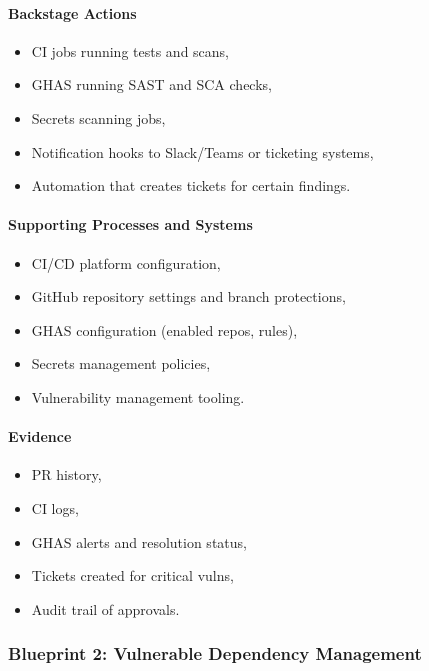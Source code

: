 \documentclass[11pt]{article}
\begin{document}
\paragraph{Backstage Actions}

\begin{itemize}
  \item CI jobs running tests and scans,
  \item GHAS running SAST and SCA checks,
  \item Secrets scanning jobs,
  \item Notification hooks to Slack/Teams or ticketing systems,
  \item Automation that creates tickets for certain findings.
\end{itemize}

\paragraph{Supporting Processes and Systems}

\begin{itemize}
  \item CI/CD platform configuration,
  \item GitHub repository settings and branch protections,
  \item GHAS configuration (enabled repos, rules),
  \item Secrets management policies,
  \item Vulnerability management tooling.
\end{itemize}

\paragraph{Evidence}

\begin{itemize}
  \item PR history,
  \item CI logs,
  \item GHAS alerts and resolution status,
  \item Tickets created for critical vulns,
  \item Audit trail of approvals.
\end{itemize}

\subsubsection*{Blueprint 2: Vulnerable Dependency Management}
\end{document}
